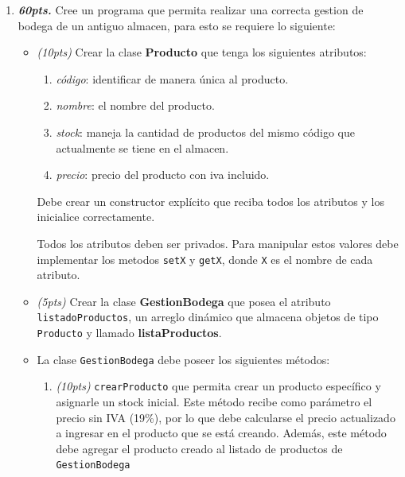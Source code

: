 \documentclass{exam}
\begin{document}
\begin{questions}

  \begin{enumerate}
  \item \textbf{\emph{60pts.}} Cree un programa que permita realizar una correcta gestion de bodega de un antiguo almacen, para esto se requiere  lo siguiente:
    \begin{itemize}

    \item \emph{(10pts)} Crear la clase \textbf{Producto} que tenga
      los siguientes atributos:
      
      \begin{enumerate}
      \item \emph{código}: identificar de manera única al producto.
      \item \emph{nombre}: el nombre del producto.
      \item \emph{stock}: maneja la cantidad de productos del mismo
        código que actualmente se tiene en el almacen.
      \item \emph{precio}: precio del producto con iva incluido.
      \end{enumerate}

      Debe crear un constructor explícito que reciba todos los
      atributos y los inicialice correctamente.
      
      Todos los atributos deben ser privados. Para manipular estos
      valores debe implementar los metodos \texttt{setX} y
      \texttt{getX}, donde \texttt{X} es el nombre de cada atributo.

    \item \emph{(5pts)} Crear la clase \textbf{GestionBodega} que
      posea el atributo \texttt{listadoProductos}, un arreglo dinámico
      que almacena objetos de tipo \texttt{Producto} y llamado
      \textbf{listaProductos}.

    \item La clase \texttt{GestionBodega} debe poseer los siguientes métodos:
      \begin{enumerate}

      \item \emph{(10pts)} \texttt{crearProducto} que permita crear un
        producto específico y asignarle un stock inicial. Este método
        recibe como parámetro el precio sin IVA (19\%), por lo que
        debe calcularse el precio actualizado a ingresar en el
        producto que se está creando. Además, este método debe agregar
        el producto creado al listado de productos de
        \texttt{GestionBodega}


\end{enumerate}
\end{itemize}
\end{enumerate}
\end{questions}
\end{document}
